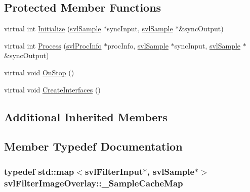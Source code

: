 \subsection*{Protected Member Functions}
\begin{DoxyCompactItemize}
\item 
virtual int \hyperlink{classsvl_filter_image_overlay_a5bc58766f4b4b26c27b3a11215482e82}{Initialize} (\hyperlink{classsvl_sample}{svl\+Sample} $\ast$sync\+Input, \hyperlink{classsvl_sample}{svl\+Sample} $\ast$\&sync\+Output)
\item 
virtual int \hyperlink{classsvl_filter_image_overlay_a9c9ee1c08fa8e647597ce6b484b01607}{Process} (\hyperlink{structsvl_proc_info}{svl\+Proc\+Info} $\ast$proc\+Info, \hyperlink{classsvl_sample}{svl\+Sample} $\ast$sync\+Input, \hyperlink{classsvl_sample}{svl\+Sample} $\ast$\&sync\+Output)
\item 
virtual void \hyperlink{classsvl_filter_image_overlay_a062f860bb4efedcf5d67ef616c5a8ab6}{On\+Stop} ()
\item 
virtual void \hyperlink{classsvl_filter_image_overlay_ae012a89b44bd3b6f6c510e01a1b43603}{Create\+Interfaces} ()
\end{DoxyCompactItemize}
\subsection*{Additional Inherited Members}


\subsection{Member Typedef Documentation}
\hypertarget{classsvl_filter_image_overlay_a0cb98a1b14141d0a0940656ebec8d3ea}{}
\subsubsection[{\+\_\+\+Sample\+Cache\+Map}]{\setlength{\rightskip}{0pt plus 5cm}typedef std\+::map$<${\bf svl\+Filter\+Input}$\ast$, {\bf svl\+Sample}$\ast$$>$ {\bf svl\+Filter\+Image\+Overlay\+::\+\_\+\+Sample\+Cache\+Map}\hspace{0.3cm}{\ttfamily [protected]}}\label{classsvl_filter_image_overlay_a0cb98a1b14141d0a0940656ebec8d3ea}
\hypertarget{classsvl_filter_image_overlay_ae7f68bdaad7a6718f5d38e99099fd1a4}{}
